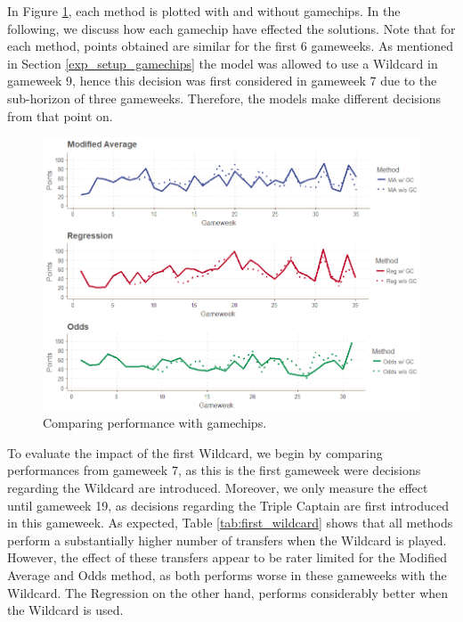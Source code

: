 In Figure \ref{fig:res_comp_gamechips}, each method is plotted with and without gamechips. In the following, we discuss how each gamechip have effected the solutions. Note that for each method, points obtained are similar for the first 6 gameweeks. As mentioned in Section \ref{exp_setup_gamechips} the model was allowed to use a Wildcard in gameweek 9, hence this decision was first considered in gameweek 7 due to the sub-horizon of three gameweeks. Therefore, the models make different decisions from that point on.

\begin{figure}[H]
    \centering
    \includegraphics[scale=0.5]{fig/chapter_7/w_wo_gc_all.png}
    \caption{Comparing performance with gamechips.}
\label{fig:res_comp_gamechips}    
\end{figure}


To evaluate the impact of the first Wildcard,  we begin by comparing performances from gameweek 7, as this is the first gameweek were decisions regarding the Wildcard are introduced. Moreover, we only measure the effect until gameweek 19, as decisions regarding the Triple Captain are first introduced in this gameweek. As expected, Table \ref{tab:first_wildcard} shows that all methods perform a substantially higher number of transfers when the Wildcard is played. However, the effect of these transfers appear to be rater limited for the Modified Average and Odds method, as both performs worse in these gameweeks with the Wildcard. The Regression on the other hand, performs considerably better when the Wildcard is used.  

\newpar




